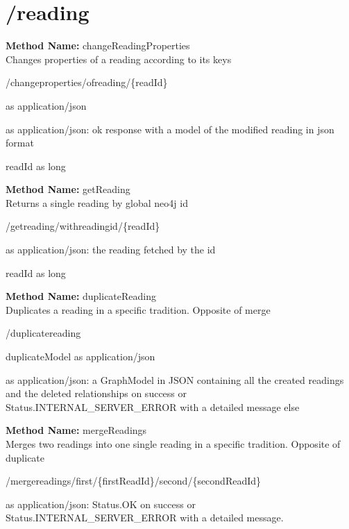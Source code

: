 \section{/reading}
\textbf{Method Name: }changeReadingProperties \\ Changes properties of a reading according to its keys
\begin{post}
/changeproperties/ofreading/\{readId\}
\end{post}
\begin{request}
 as application/json
\end{request}
\begin{response}
 as application/json: ok response with a model of the modified reading in json format
\end{response}
\begin{parameter}
readId as long
\end{parameter}
\textbf{Method Name: }getReading \\ Returns a single reading by global neo4j id
\begin{get}
/getreading/withreadingid/\{readId\}
\end{get}
\begin{response}
 as application/json: the reading fetched by the id
\end{response}
\begin{parameter}
readId as long
\end{parameter}
\textbf{Method Name: }duplicateReading \\ Duplicates a reading in a specific tradition. Opposite of merge
\begin{post}
/duplicatereading
\end{post}
\begin{request}
duplicateModel as application/json
\end{request}
\begin{response}
 as application/json: a GraphModel in JSON containing all the created readings and the deleted relationships on success or Status.INTERNAL\_SERVER\_ERROR with a detailed message else
\end{response}
\textbf{Method Name: }mergeReadings \\ Merges two readings into one single reading in a specific tradition. Opposite of duplicate
\begin{post}
/mergereadings/first/\{firstReadId\}/second/\{secondReadId\}
\end{post}
\begin{response}
 as application/json: Status.OK on success or Status.INTERNAL\_SERVER\_ERROR with a detailed message.
\end{response}

